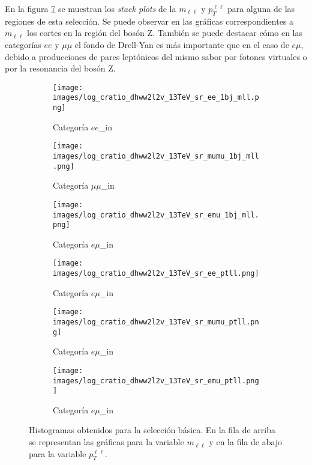 En la figura \ref{fig:comparacion_preseleccion_basica} se muestran los \textit{stack plots} de la $m_{\ell \ell}$ y $p_T^{\ell \ell}$ para alguna de las regiones de esta selección. Se puede observar en las gráficas correspondientes a $m_{\ell \ell}$ los cortes en la región del bosón Z. También se puede destacar cómo en las categorías $ee$ y $\mu \mu$ el fondo de Drell-Yan es más importante que en el caso de $e \mu$, debido a producciones de pares leptónicos del mismo sabor por fotones virtuales o por la resonancia del bosón Z.\\


\begin{figure}[h!]
     \centering
     \begin{subfigure}[b]{0.32\textwidth}
         \centering
         \texttt{[image: images/log\_cratio\_dhww2l2v\_13TeV\_sr\_ee\_1bj\_mll.png]}
         \caption{Categoría $ee$\_in}
         \label{fig: ANALISISWW}
     \end{subfigure}
     \begin{subfigure}[b]{0.32\textwidth}
         \centering
         \texttt{[image: images/log\_cratio\_dhww2l2v\_13TeV\_sr\_mumu\_1bj\_mll.png]}
         \caption{Categoría $\mu \mu$\_in}
         \label{fig: ANALISISttbar}
     \end{subfigure}
     \begin{subfigure}[b]{0.32\textwidth}
         \centering
         \texttt{[image: images/log\_cratio\_dhww2l2v\_13TeV\_sr\_emu\_1bj\_mll.png]}
         \caption{Categoría $e \mu$\_in}
         \label{}
     \end{subfigure}
     \hfill
    \begin{subfigure}[b]{0.32\textwidth}
        \centering
         \texttt{[image: images/log\_cratio\_dhww2l2v\_13TeV\_sr\_ee\_ptll.png]}
         \caption{Categoría $e \mu$\_in}
         \label{}
     \end{subfigure}
         \begin{subfigure}[b]{0.32\textwidth}
        \centering
         \texttt{[image: images/log\_cratio\_dhww2l2v\_13TeV\_sr\_mumu\_ptll.png]}
         \caption{Categoría $e \mu$\_in}
         \label{}
     \end{subfigure}
         \begin{subfigure}[b]{0.32\textwidth}
        \centering
         \texttt{[image: images/log\_cratio\_dhww2l2v\_13TeV\_sr\_emu\_ptll.png]}
         \caption{Categoría $e \mu$\_in}
         \label{}
     \end{subfigure}
     
     \caption{Histogramas obtenidos para la selección básica. En la fila de arriba se representan las gráficas para la variable $m_{\ell \ell}$ y en la fila de abajo para la variable $p_T^{\ell \ell}$.}     \label{fig:comparacion_preseleccion_basica}

\end{figure}

